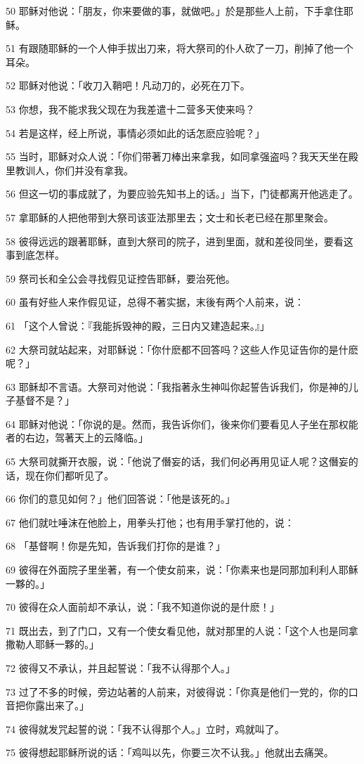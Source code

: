 \par 50 耶稣对他说：「朋友，你来要做的事，就做吧。」於是那些人上前，下手拿住耶稣。
\par 51 有跟随耶稣的一个人伸手拔出刀来，将大祭司的仆人砍了一刀，削掉了他一个耳朵。
\par 52 耶稣对他说：「收刀入鞘吧！凡动刀的，必死在刀下。
\par 53 你想，我不能求我父现在为我差遣十二营多天使来吗？
\par 54 若是这样，经上所说，事情必须如此的话怎麽应验呢？」
\par 55 当时，耶稣对众人说：「你们带著刀棒出来拿我，如同拿强盗吗？我天天坐在殿里教训人，你们并没有拿我。
\par 56 但这一切的事成就了，为要应验先知书上的话。」当下，门徒都离开他逃走了。
\par 57 拿耶稣的人把他带到大祭司该亚法那里去；文士和长老已经在那里聚会。
\par 58 彼得远远的跟著耶稣，直到大祭司的院子，进到里面，就和差役同坐，要看这事到底怎样。
\par 59 祭司长和全公会寻找假见证控告耶稣，要治死他。
\par 60 虽有好些人来作假见证，总得不著实据，末後有两个人前来，说：
\par 61 「这个人曾说：『我能拆毁神的殿，三日内又建造起来。』」
\par 62 大祭司就站起来，对耶稣说：「你什麽都不回答吗？这些人作见证告你的是什麽呢？」
\par 63 耶稣却不言语。大祭司对他说：「我指著永生神叫你起誓告诉我们，你是神的儿子基督不是？」
\par 64 耶稣对他说：「你说的是。然而，我告诉你们，後来你们要看见人子坐在那权能者的右边，驾著天上的云降临。」
\par 65 大祭司就撕开衣服，说：「他说了僭妄的话，我们何必再用见证人呢？这僭妄的话，现在你们都听见了。
\par 66 你们的意见如何？」他们回答说：「他是该死的。」
\par 67 他们就吐唾沫在他脸上，用拳头打他；也有用手掌打他的，说：
\par 68 「基督啊！你是先知，告诉我们打你的是谁？」
\par 69 彼得在外面院子里坐著，有一个使女前来，说：「你素来也是同那加利利人耶稣一夥的。」
\par 70 彼得在众人面前却不承认，说：「我不知道你说的是什麽！」
\par 71 既出去，到了门口，又有一个使女看见他，就对那里的人说：「这个人也是同拿撒勒人耶稣一夥的。」
\par 72 彼得又不承认，并且起誓说：「我不认得那个人。」
\par 73 过了不多的时候，旁边站著的人前来，对彼得说：「你真是他们一党的，你的口音把你露出来了。」
\par 74 彼得就发咒起誓的说：「我不认得那个人。」立时，鸡就叫了。
\par 75 彼得想起耶稣所说的话：「鸡叫以先，你要三次不认我。」他就出去痛哭。

